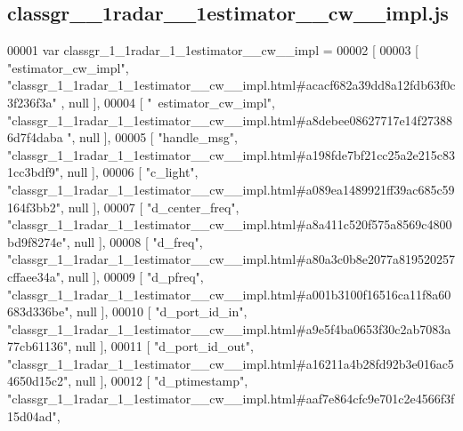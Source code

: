 \subsection{classgr\+\_\+\_\+1radar\+\_\+\_\+1estimator\+\_\+\+\_\+cw\+\_\+\+\_\+impl.\+js}
\label{classgr__1__1radar__1__1estimator____cw____impl_8js_source}

\begin{DoxyCode}
00001 var classgr_1_1radar_1_1estimator__cw__impl =
00002 [
00003     [ \textcolor{stringliteral}{"estimator\_cw\_impl"}, \textcolor{stringliteral}{"classgr\_1\_1radar\_1\_1estimator\_\_cw\_\_impl.html#acacf682a39dd8a12fdb63f0c3f236f3a"}
      , null ],
00004     [ \textcolor{stringliteral}{"~estimator\_cw\_impl"}, \textcolor{stringliteral}{"classgr\_1\_1radar\_1\_1estimator\_\_cw\_\_impl.html#a8debee08627717e14f273886d7f4daba
      "}, null ],
00005     [ \textcolor{stringliteral}{"handle\_msg"}, \textcolor{stringliteral}{"classgr\_1\_1radar\_1\_1estimator\_\_cw\_\_impl.html#a198fde7bf21cc25a2e215c831cc3bdf9"}, null 
      ],
00006     [ \textcolor{stringliteral}{"c\_light"}, \textcolor{stringliteral}{"classgr\_1\_1radar\_1\_1estimator\_\_cw\_\_impl.html#a089ea1489921ff39ac685c59164f3bb2"}, null ],
00007     [ \textcolor{stringliteral}{"d\_center\_freq"}, \textcolor{stringliteral}{"classgr\_1\_1radar\_1\_1estimator\_\_cw\_\_impl.html#a8a411c520f575a8569c4800bd9f8274e"}, 
      null ],
00008     [ \textcolor{stringliteral}{"d\_freq"}, \textcolor{stringliteral}{"classgr\_1\_1radar\_1\_1estimator\_\_cw\_\_impl.html#a80a3c0b8e2077a819520257cffaee34a"}, null ],
00009     [ \textcolor{stringliteral}{"d\_pfreq"}, \textcolor{stringliteral}{"classgr\_1\_1radar\_1\_1estimator\_\_cw\_\_impl.html#a001b3100f16516ca11f8a60683d336be"}, null ],
00010     [ \textcolor{stringliteral}{"d\_port\_id\_in"}, \textcolor{stringliteral}{"classgr\_1\_1radar\_1\_1estimator\_\_cw\_\_impl.html#a9e5f4ba0653f30c2ab7083a77cb61136"}, 
      null ],
00011     [ \textcolor{stringliteral}{"d\_port\_id\_out"}, \textcolor{stringliteral}{"classgr\_1\_1radar\_1\_1estimator\_\_cw\_\_impl.html#a16211a4b28fd92b3e016ac54650d15c2"}, 
      null ],
00012     [ \textcolor{stringliteral}{"d\_ptimestamp"}, \textcolor{stringliteral}{"classgr\_1\_1radar\_1\_1estimator\_\_cw\_\_impl.html#aaf7e864cfc9e701c2e4566f3f15d04ad"}, 

\end{DoxyCode}
